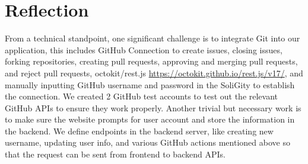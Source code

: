 \documentclass[12pt]{article}
\renewcommand{\_}{\kern-1.5pt\textunderscore\kern-1.5pt}
\begin{document}






\renewcommand\thesection{\arabic{section}}
\renewcommand\thesubsection{\thesection.\arabic{subsection}}

\section{Reflection}
From a technical standpoint, one significant challenge is to integrate Git into our application, this includes GitHub Connection to create issues, closing issues, forking repositories, creating pull requests, approving and merging pull requests, and reject pull requests, octokit/rest.js \url{https://octokit.github.io/rest.js/v17/}, and manually inputting GitHub username and password in the SoliGity to establish the connection. We created 2 GitHub test accounts to test out the relevant GitHub APIs to ensure they work properly. Another trivial but necessary work is to make sure the website prompts for user account and store the information in the backend. We define endpoints in the backend server, like creating new username, updating user info, and various GitHub actions mentioned above so that the request can be sent from frontend to backend APIs.
\end{document}
